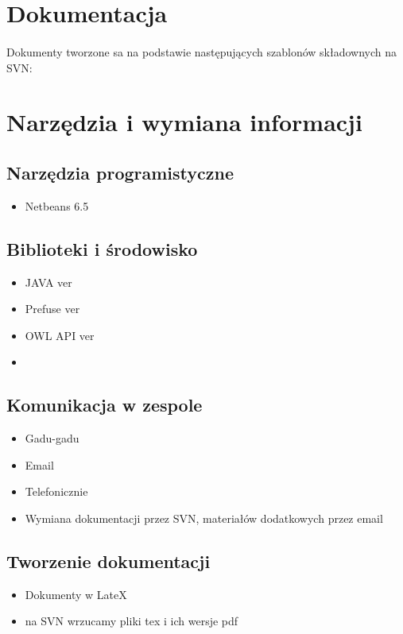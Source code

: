 \documentclass[a4paper,10pt]{article}
\begin{document}
\section{Dokumentacja}

\paragraph{} Dokumenty tworzone sa na podstawie następujących szablonów składownych na SVN:



\section{Narzędzia i wymiana informacji}
\subsection{Narzędzia programistyczne}
\begin{itemize}
 \item Netbeans 6.5

\end{itemize}
\subsection{Biblioteki i środowisko}
\begin{itemize}
	\item JAVA ver 
  	\item Prefuse ver
	\item OWL API ver
	\item 
\end{itemize}

\subsection{Komunikacja w zespole}
\begin{itemize}
 	\item Gadu-gadu
	\item Email
	\item Telefonicznie
	\item Wymiana dokumentacji przez SVN, materiałów dodatkowych przez email
\end{itemize}

\subsection{Tworzenie dokumentacji}
\begin{itemize}
 	\item Dokumenty w LateX
	\item na SVN wrzucamy pliki tex i ich wersje pdf
\end{itemize}



\clearpage
{}
{}

\end{document}
